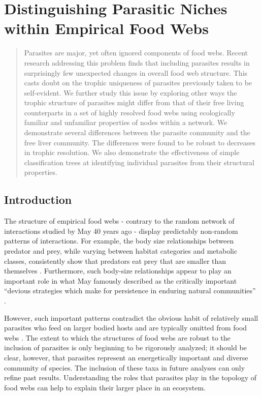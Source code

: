 \documentclass[/home/nkappler/Research/Dissertation/dissertation.tex]{subfiles}
\title{}
\begin{document}
\chapter{Distinguishing Parasitic Niches within Empirical Food Webs}

\begin{bibunit}
\begin{abstract} 
    
    Parasites are major, yet often ignored components of food webs. Recent
    research addressing this problem finds that including parasites results in
    surprisingly few unexpected changes in overall food web structure. This
    casts doubt on the trophic uniqueness of parasites previously taken to be
    self-evident. We further study this issue by exploring other ways the
    trophic structure of parasites might differ from that of their free living
    counterparts in a set of highly resolved food webs using ecologically
    familiar and unfamiliar properties of nodes within a network. We
    demonstrate several differences between the parasite community and the free
    liver community. The differences were found to be robust to decreases in
    trophic resolution. We also demonstrate the effectiveness of simple
    classification trees at identifying individual parasites from their
    structural properties.

\end{abstract}

\newpage

\section{Introduction}

The structure of empirical food webs - contrary to the random network of
interactions studied by May 40 years ago - display predictably non-random
patterns of interactions.  For example, the body size relationships between
predator and prey, while varying between habitat categories and metabolic
classes, consistently show that predators eat prey that are smaller than
themselves \cite*{Brose2006a}. Furthermore, such body-size relationships appear
to play an important role in what May famously described as the critically
important ``devious strategies which make for persistence in enduring natural
communities'' \cite*{Brose2006b, Otto2007}.

However, such important patterns contradict the obvious habit of relatively
small parasites who feed on larger bodied hosts and are typically omitted from
food webs \cite*{Marcogliese1997}. The extent to which the structures of food
webs are robust to the inclusion of parasites is only beginning to be
rigorously analyzed; it should be clear, however, that parasites represent an
energetically important and diverse community of species. The inclusion of
these taxa in future analyses can only refine past results. Understanding the
roles that parasites play in the topology of food webs can help to explain
their larger place in an ecosystem.


\end{bibunit}
\end{document}
